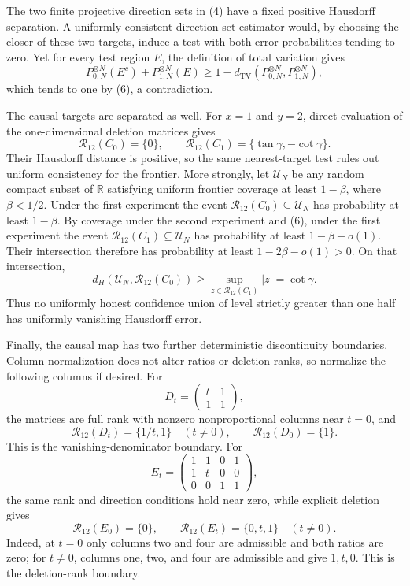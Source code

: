 The two finite projective direction sets in (4) have a fixed positive Hausdorff separation. A uniformly consistent direction-set estimator would, by choosing the closer of these two targets, induce a test with both error probabilities tending to zero. Yet for every test region \(E\), the definition of total variation gives
\[
 P_{0,N}^{\otimes N}(E^c)+P_{1,N}^{\otimes N}(E)
 \ge1-d_{\mathrm{TV}}(P_{0,N}^{\otimes N},P_{1,N}^{\otimes N}),
\]
which tends to one by (6), a contradiction.

The causal targets are separated as well. For \(x=1\) and \(y=2\), direct evaluation of the one-dimensional deletion matrices gives
\[
 \mathcal R_{12}(C_0)=\{0\},
 \qquad
 \mathcal R_{12}(C_1)=\{\tan\gamma,-\cot\gamma\}.
 \tag{7}
\]
Their Hausdorff distance is positive, so the same nearest-target test rules out uniform consistency for the frontier. More strongly, let \(\mathcal U_N\) be any random compact subset of \(\mathbb R\) satisfying uniform frontier coverage at least \(1-\beta\), where \(\beta<1/2\). Under the first experiment the event \(\mathcal R_{12}(C_0)\subseteq\mathcal U_N\) has probability at least \(1-\beta\). By coverage under the second experiment and (6), under the first experiment the event \(\mathcal R_{12}(C_1)\subseteq\mathcal U_N\) has probability at least \(1-\beta-o(1)\). Their intersection therefore has probability at least \(1-2\beta-o(1)>0\). On that intersection,
\[
 d_H(\mathcal U_N,\mathcal R_{12}(C_0))
 \ge \sup_{z\in\mathcal R_{12}(C_1)}|z|
 =\cot\gamma.
\]
Thus no uniformly honest confidence union of level strictly greater than one half has uniformly vanishing Hausdorff error.

Finally, the causal map has two further deterministic discontinuity boundaries. Column normalization does not alter ratios or deletion ranks, so normalize the following columns if desired. For
\[
 D_t=\begin{pmatrix}t&1\\1&1\end{pmatrix},
\]
the matrices are full rank with nonzero nonproportional columns near \(t=0\), and
\[
 \mathcal R_{12}(D_t)=\{1/t,1\}\quad(t\ne0),
 \qquad
 \mathcal R_{12}(D_0)=\{1\}.
 \tag{8}
\]
This is the vanishing-denominator boundary. For
\[
 E_t=
 \begin{pmatrix}
 1&1&0&1\\
 1&t&0&0\\
 0&0&1&1
 \end{pmatrix},
\]
the same rank and direction conditions hold near zero, while explicit deletion gives
\[
 \mathcal R_{12}(E_0)=\{0\},
 \qquad
 \mathcal R_{12}(E_t)=\{0,t,1\}\quad(t\ne0).
 \tag{9}
\]
Indeed, at \(t=0\) only columns two and four are admissible and both ratios are zero; for \(t\ne0\), columns one, two, and four are admissible and give \(1,t,0\). This is the deletion-rank boundary.

